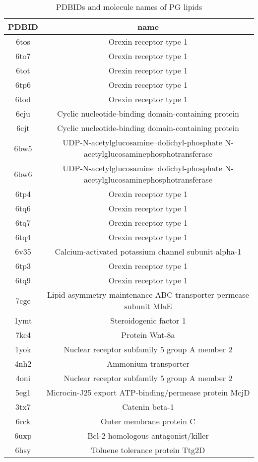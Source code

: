 \documentclass{article}
\begin{document}
\begin{table}[]
    \centering
    \begin{tabular}{c|c}
PDBID & name \\
\hline
6tos & Orexin receptor type 1 \\ 
6to7 & Orexin receptor type 1 \\ 
6tot & Orexin receptor type 1 \\ 
6tp6 & Orexin receptor type 1 \\ 
6tod & Orexin receptor type 1 \\ 
6cju & Cyclic nucleotide-binding domain-containing protein \\ 
6cjt & Cyclic nucleotide-binding domain-containing protein \\ 
6bw5 & UDP-N-acetylglucosamine--dolichyl-phosphate N-acetylglucosaminephosphotransferase \\ 
6bw6 & UDP-N-acetylglucosamine--dolichyl-phosphate N-acetylglucosaminephosphotransferase \\ 
6tp4 & Orexin receptor type 1 \\ 
6tq6 & Orexin receptor type 1 \\ 
6tq7 & Orexin receptor type 1 \\ 
6tq4 & Orexin receptor type 1 \\ 
6v35 & Calcium-activated potassium channel subunit alpha-1 \\ 
6tp3 & Orexin receptor type 1 \\ 
6tq9 & Orexin receptor type 1 \\ 
7cge & Lipid asymmetry maintenance ABC transporter permease subunit MlaE \\ 
1ymt & Steroidogenic factor 1 \\ 
7kc4 & Protein Wnt-8a \\ 
1yok & Nuclear receptor subfamily 5 group A member 2 \\ 
4nh2 & Ammonium transporter \\ 
4oni & Nuclear receptor subfamily 5 group A member 2 \\ 
5eg1 & Microcin-J25 export ATP-binding/permease protein McjD \\ 
3tx7 & Catenin beta-1 \\ 
6rck & Outer membrane protein C \\ 
6uxp & Bcl-2 homologous antagonist/killer \\ 
6hsy & Toluene tolerance protein Ttg2D \\ 
\end{tabular}
    \caption{PDBIDs and molecule names of PG lipids}
    \label{tab:my_label}
\end{table}
\end{document}
